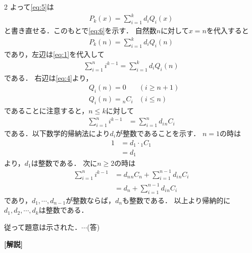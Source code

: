 \documentclass[../../main.tex]{subfiles}
\begin{document}
\begin{multicols}{2}
  よって\cref{eq:5}は
  \begin{align}
    P_{k}(x) = \sum_{i=1}^k d_i Q_i(x)
  \end{align}
  と書き直せる．このもとで\cref{eq:6}を示す．
  自然数$n$に対して$x=n$を代入すると
  \begin{align}
    P_{k}(n) = \sum_{i=1}^k d_i Q_i(n)
  \end{align}
  であり，左辺は\cref{eq:1}を代入して
  \begin{align}
    \sum_{i=1}^n i^{k-1} = \sum_{i=1}^k d_i Q_i(n)
  \end{align}
  である．
  右辺は\cref{eq:4}より，
  \begin{align}
    & Q_{i}(n) = 0           & (i \ge n+1) \\
    & Q_{i}(n) = {}_{n}C_{i} & (i \le n)
  \end{align}
  であることに注意すると，$n \le k$に対して
  \begin{align}
    \sum_{i=1}^n i^{k-1}
    & = \sum_{i=1}^{n} d_i {}_{n}C_{i}
  \end{align}
  である．以下数学的帰納法により$d_i$が整数であることを示す．
  $n=1$の時は
  \begin{align}
    1
    & = d_{1}\cdot {}_{1}C_{1} \\
    & = d_{1}
  \end{align}
  より，$d_{1}$は整数である．
  次に$n\ge 2$の時は
  \begin{align}
    \sum_{i=1}^n i^{k-1}
    & = d_n {}_{n}C_{n} + \sum_{i=1}^{n-1} d_i {}_{n}C_{i} \\
    & = d_n + \sum_{i=1}^{n-1} d_i {}_{n}C_{i}
  \end{align}
  であり，$d_1,\cdots,d_{n-1}$が整数ならば，$d_n$も整数である．
  以上より帰納的に$d_1,d_2,\cdots,d_{k}$は整数である．

  従って題意は示された．$\cdots$(答)

  {\bf [解説]}

  \newpage
\end{multicols}
\end{document}
